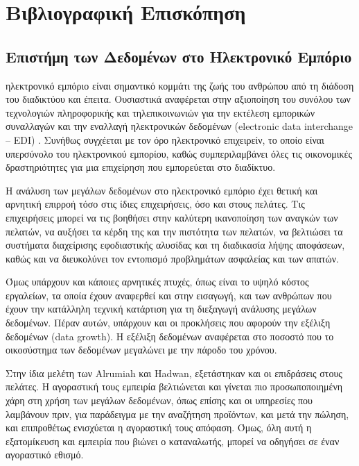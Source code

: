 \documentclass{article}
\begin{document}
\newpage


\section{Βιβλιογραφική Επισκόπηση}


\subsection{Επιστήμη των Δεδομένων στο Ηλεκτρονικό Εμπόριο}

 ηλεκτρονικό εμπόριο είναι σημαντικό κομμάτι της ζωής του ανθρώπου από τη διάδοση του διαδικτύου και έπειτα. Ουσιαστικά αναφέρεται στην αξιοποίηση του συνόλου των τεχνολογιών πληροφορικής και τηλεπικοινωνιών για την εκτέλεση εμπορικών συναλλαγών και την εναλλαγή ηλεκτρονικών δεδομένων (electronic data interchange – EDI) \cite{jain2021overview}. Συνήθως συγχέεται με τον όρο ηλεκτρονικό επιχειρείν, το οποίο είναι υπερσύνολο του ηλεκτρονικού εμπορίου, καθώς συμπεριλαμβάνει όλες τις οικονομικές δραστηριότητες για μια επιχείρηση που εμπορεύεται στο διαδίκτυο. \cite{turban2017introduction}

Η ανάλυση των μεγάλων δεδομένων στο ηλεκτρονικό εμπόριο έχει θετική και αρνητική επιρροή τόσο στις ίδιες επιχειρήσεις, όσο και στους πελάτες. \cite{alrumiah2021implementing} Τις επιχειρήσεις μπορεί να τις βοηθήσει στην καλύτερη ικανοποίηση των αναγκών των πελατών, να αυξήσει τα κέρδη της και την πιστότητα των πελατών, να βελτιώσει τα συστήματα διαχείρισης εφοδιαστικής αλυσίδας και τη διαδικασία λήψης αποφάσεων, καθώς και να διευκολύνει τον εντοπισμό προβλημάτων ασφαλείας και των απατών. 

Όμως υπάρχουν και κάποιες αρνητικές πτυχές, όπως είναι το υψηλό κόστος εργαλείων, τα οποία έχουν αναφερθεί και στην εισαγωγή, και των ανθρώπων που έχουν την κατάλληλη τεχνική κατάρτιση για τη διεξαγωγή ανάλυσης μεγάλων δεδομένων. Πέραν αυτών, υπάρχουν και οι προκλήσεις που αφορούν την εξέλιξη δεδομένων (data growth). Η εξέλιξη δεδομένων αναφέρεται στο ποσοστό που το οικοσύστημα των δεδομένων μεγαλώνει με την πάροδο του χρόνου. \cite{Seagate.com} 

Στην ίδια μελέτη των Alrumiah και Hadwan\cite{alrumiah2021implementing}, εξετάστηκαν και οι επιδράσεις στους πελάτες. Η αγοραστική τους εμπειρία βελτιώνεται και γίνεται πιο προσωποποιημένη χάρη στη χρήση των μεγάλων δεδομένων, όπως επίσης και οι υπηρεσίες που λαμβάνουν πριν, για παράδειγμα με την αναζήτηση προϊόντων, και μετά την πώληση, και επιπροθέτως ενισχύεται η αγοραστική τους απόφαση. Όμως, όλη αυτή η εξατομίκευση και εμπειρία που βιώνει ο καταναλωτής, μπορεί να οδηγήσει σε έναν αγοραστικό εθισμό.
\end{document}
